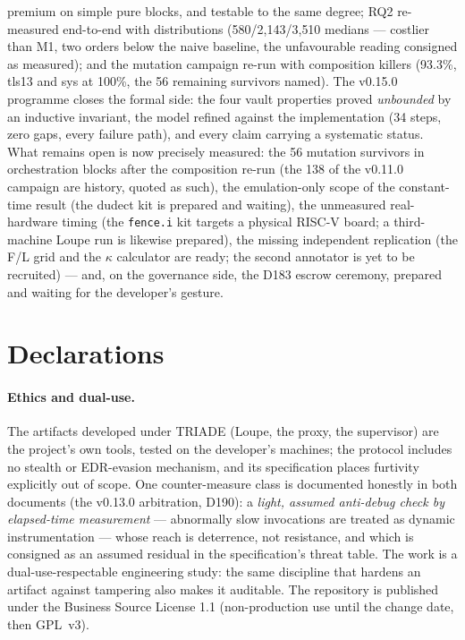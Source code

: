 \documentclass[11pt,a4paper]{article}
\newcommand{\code}[1]{\texttt{\small #1}}
\begin{document}
premium on simple pure blocks, and testable to the same degree; RQ2
re-measured end-to-end with distributions (580/2{,}143/3{,}510 medians ---
costlier than M1, two orders below the naive baseline, the unfavourable
reading consigned as measured); and the mutation campaign re-run with
composition killers (93.3\%, tls13 and sys at 100\%, the 56 remaining
survivors named). The v0.15.0 programme closes the formal side: the four vault
properties proved \emph{unbounded} by an inductive invariant, the model
refined against the implementation (34 steps, zero gaps, every failure
path), and every claim carrying a systematic status. What remains open
is now precisely measured: the 56 mutation survivors in orchestration
blocks after the composition re-run (the 138 of the v0.11.0 campaign
are history, quoted as such), the emulation-only scope of the constant-time result (the dudect
kit is prepared and waiting), the unmeasured real-hardware timing
(the \code{fence.i} kit targets a physical RISC-V board; a third-machine
Loupe run is likewise prepared), the missing independent replication
(the F/L grid and the $\kappa$ calculator are ready; the second
annotator is yet to be recruited) --- and, on the
governance side, the D183 escrow ceremony, prepared and waiting for the
developer's gesture.

\section*{Declarations}

\paragraph{Ethics and dual-use.} The artifacts developed under TRIADE
(Loupe, the proxy, the supervisor) are the project's own tools, tested on
the developer's machines; the protocol includes no stealth or
EDR-evasion mechanism, and its specification places furtivity explicitly
out of scope. One counter-measure class is documented honestly in both
documents (the v0.13.0 arbitration, D190): a \emph{light, assumed
anti-debug check by elapsed-time measurement} --- abnormally slow
invocations are treated as dynamic instrumentation --- whose reach is
deterrence, not resistance, and which is consigned as an assumed residual
in the specification's threat table. The work is a dual-use-respectable
engineering study: the same discipline that hardens an artifact against
tampering also makes it auditable. The repository is published under the
Business Source License 1.1 (non-production use until the change date,
then GPL~v3).
\end{document}
